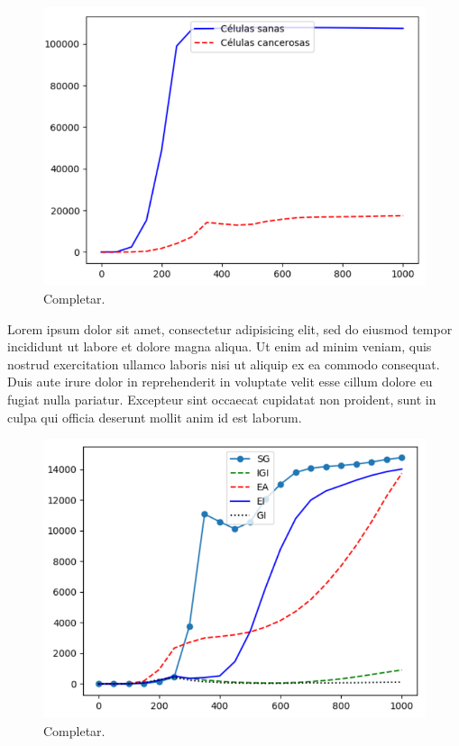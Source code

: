 \begin{figure}[h]
\centering
\includegraphics[scale=0.8]{figures/experiments/exp2/healthvscarcino}
\caption{Completar.}
\end{figure}

Lorem ipsum dolor sit amet, consectetur adipisicing elit, sed do eiusmod tempor incididunt ut labore et dolore magna aliqua.
Ut enim ad minim veniam, quis nostrud exercitation ullamco laboris nisi ut aliquip ex ea commodo consequat.
Duis aute irure dolor in reprehenderit in voluptate velit esse cillum dolore eu fugiat nulla pariatur.
Excepteur sint occaecat cupidatat non proident, sunt in culpa qui officia deserunt mollit anim id est laborum.

\begin{figure}[h]
\centering
\includegraphics[scale=0.8]{figures/experiments/exp2/mutations}
\caption{Completar.}
\end{figure}

